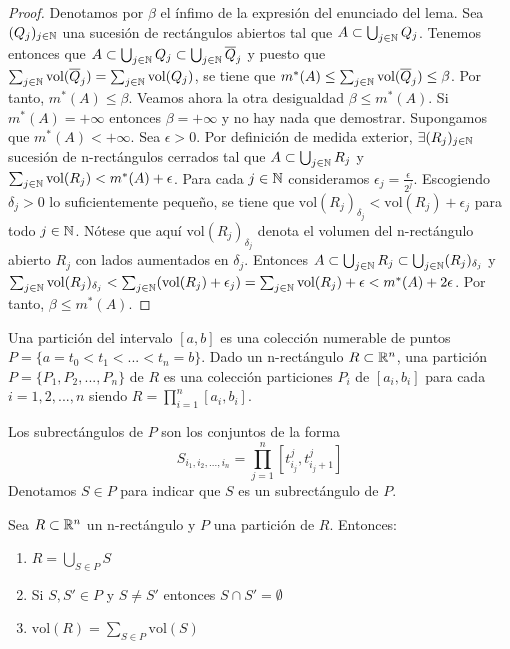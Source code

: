 \begin{proof}
    Denotamos por $\beta$ el ínfimo de la expresión del enunciado del lema. Sea $(Q_j)_{j \in \mathbb{N}}$ una sucesión de rectángulos abiertos tal que $A \subset \bigcup_{j \in \mathbb{N}} Q_j$. Tenemos entonces que $A \subset \bigcup_{j \in \mathbb{N}} Q_j \subset \bigcup_{j \in \mathbb{N}} \overline{Q}_j$ y puesto que $\sum_{j \in \mathbb{N}} \text{vol}(\overline{Q}_j) = \sum_{j \in \mathbb{N}} \text{vol}(Q_j)$, se tiene que $m^*(A) \leq \sum_{j \in \mathbb{N}} \text{vol}(\overline{Q}_j) \leq \beta$. Por tanto, $m^*(A) \leq \beta$. Veamos ahora la otra desigualdad $\beta \leq m^*(A)$. Si $m^*(A) = +\infty$ entonces $\beta = +\infty$ y no hay nada que demostrar. Supongamos que $m^*(A) < +\infty$. Sea $\epsilon > 0$. Por definición de medida exterior, $\exists (R_j)_{j \in \mathbb{N}}$ sucesión de n-rectángulos cerrados tal que $A \subset \bigcup_{j \in \mathbb{N}} R_j$ y $\sum_{j \in \mathbb{N}} \text{vol}(R_j) < m^*(A) + \epsilon$. Para cada $j \in \mathbb{N}$ consideramos $\epsilon_j = \frac{\epsilon}{2^j}$. Escogiendo $\delta_j > 0$ lo suficientemente pequeño, se tiene que $\text{vol}(R_j)_{\delta_j} < \text{vol}(R_j) + \epsilon_j$ para todo $j \in \mathbb{N}$. Nótese que aquí $\text{vol}(R_j)_{\delta_j}$ denota el volumen del n-rectángulo abierto $R_j$ con lados aumentados en $\delta_j$. Entonces $A \subset \bigcup_{j \in \mathbb{N}} R_j \subset \bigcup_{j \in \mathbb{N}} (R_j)_{\delta_j}$ y $\sum_{j \in \mathbb{N}} \text{vol}(R_j)_{\delta_j} < \sum_{j \in \mathbb{N}} (\text{vol}(R_j) + \epsilon_j) = \sum_{j \in \mathbb{N}} \text{vol}(R_j) + \epsilon < m^*(A) + 2\epsilon$. Por tanto, $\beta \leq m^*(A)$.
\end{proof}

\begin{definición}
Una partición del intervalo $[a,b]$ es una colección numerable de puntos $P = \{a = t_0 < t_1 < ... < t_n = b\}$. Dado un n-rectángulo $R \subset \mathbb{R}^n$, una partición $P =  \{P_1, P_2, ..., P_n\}$ de $R$ es una colección particiones $P_i$ de $[a_i, b_i]$ para cada $i = 1, 2, ..., n$ siendo $R = \prod_{i=1}^n [a_i, b_i]$.
\end{definición}

Los subrectángulos de $P$ son los conjuntos de la forma
\begin{equation}
    S_{i_1, i_2, ..., i_n} = \prod_{j=1}^n [t_{i_j}^j, t_{i_j + 1}^j]
\end{equation}
Denotamos $S \in P$ para indicar que $S$ es un subrectángulo de $P$.

\begin{lema}
    Sea $R \subset \mathbb{R}^n$ un n-rectángulo y $P$ una partición de $R$. Entonces:
    \vspace{-0.5em}
    \begin{enumerate}
        \item $R = \bigcup_{S \in P} S$
        \item Si $S, S' \in P$ y $S \neq S'$ entonces $S \cap S' = \emptyset$
        \item $\text{vol}(R) = \sum_{S \in P} \text{vol}(S)$
    \end{enumerate}
\end{lema}

